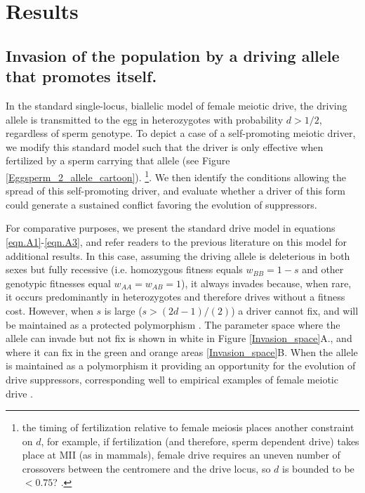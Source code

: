 \documentclass[12pt,letterpaper]{article}
\begin{document}
\section*{Results}

\subsection*{ Invasion of the population by a driving allele that promotes
itself.}

In the standard single-locus, biallelic model of female meiotic drive,
the driving allele is transmitted to the egg  in heterozygotes with
probability  $d > 1/2$, regardless of sperm genotype. To depict a case
of a self-promoting meiotic driver,  we modify this standard model such that the driver is only effective when fertilized by a sperm carrying that allele (see Figure
\ref{Eggsperm_2_allele_cartoon}). 
\footnote{the timing of fertilization relative to female meiosis places another constraint on $d$, for example, if fertilization (and therefore, sperm dependent drive) takes place at MII (as in mammals),
	female drive requires an uneven number of crossovers between the centromere and the drive locus, 
	so $d$ is bounded to be $<0.75$? \citep[see ][ for
        discussion]{Buckler1999}. }. %
We then identify the conditions allowing the spread of this self-promoting driver, 
	and evaluate whether a driver of this form could generate a sustained conflict favoring the evolution of suppressors. 

For comparative purposes, we present the standard drive model in equations \ref{eqn.A1}-\ref{eqn.A3}, 
	and refer readers to the previous literature on this model \citep[e.g. ][]{Prout1973,Ubeda2004} for additional results. 
In this case, assuming the driving allele is deleterious in both sexes but fully recessive 
	(i.e. homozygous fitness equals $w_{BB}=1-s$ and other genotypic fitnesses equal $w_{AA}=w_{AB}=1$), 
	it always invades because,  when rare, it occurs predominantly in heterozygotes and therefore drives without a fitness cost. 
However, when $s$ is large ($s>(2d-1)/(2)$) a driver cannot fix, and
will be maintained as a protected polymorphism \citep{Prout1973}. The
        parameter space where the allele can invade but not fix is shown in white
        in Figure \ref{Invasion_space}A., and where it can fix in the green
        and orange areas \ref{Invasion_space}B. When the allele is
        maintained as a polymorphism it providing an opportunity for the evolution of
	drive suppressors, corresponding well to empirical examples of
        female meiotic drive \citep[reviewed in ][]{Burt2006}. 
\end{document}
